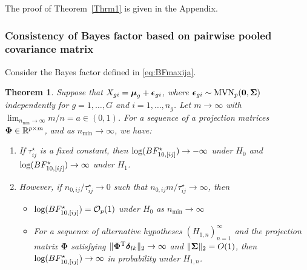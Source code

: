 \documentclass[times,sort&compress,3p]{elsarticle}
\theoremstyle{plain}%
\newtheorem{theorem}{Theorem}
\theoremstyle{definition}
\def\bzero{{\mathbf 0}}
\def\log{\hbox{log}}
\def\MVN{\hbox{MVN}}
\def\log{\hbox{log}}
\def\trans{^{\rm T}}
\def\bzero{{\mathbf 0}}
\newcommand{\bSigma}{\mbox{\boldmath $\Sigma$}}
\newcommand{\udelta}            {\mbox{\boldmath$\delta$}}
\newcommand{\uepsilon}          {\mbox{\boldmath$\epsilon$}}
\newcommand{\umu}               {\mbox{\boldmath$\mu$}}
\newcommand{\uSigma}            {\mbox{\boldmath$\Sigma$}}
\newcommand{\uPhi}              {\mbox{\boldmath$\Phi$}}
\begin{document}
The proof of Theorem~\ref{Thrm1} is given in the Appendix.

\subsubsection{Consistency of Bayes factor based on pairwise pooled covariance matrix}
Consider the Bayes factor defined in \eqref{eq:BFmaxija}. 
\begin{theorem}\label{Thrm2}
Suppose that $X_{gi} = \umu_g + \uepsilon_{gi}$, where $\uepsilon_{gi} \sim \MVN_{p}(\bzero, \uSigma)$ independently for $g = 1, \ldots, G$ and $i = 1,\ldots,n_g$. Let $m \rightarrow \infty$ with $ \lim_{n_{\min} \rightarrow \infty} m / n =  a \in  (0, 1)$. For a sequence of a projection matrices $\uPhi \in \mathbb{R}^{p \times m}$, and as $n_{\min} \rightarrow \infty$, we have:
\begin{enumerate}
    \item If $\tau^{\star}_{ij}$ is a fixed constant, 
    then $\log(BF^{\star}_{10, [ij]}) \rightarrow -\infty$ under $H_0$ and $\log(BF^{\star}_{10, [ij]}) \rightarrow \infty$ under $H_1$. 
    \item However, if $n_{0,ij}/\tau^{\star}_{ij} \rightarrow 0$ such that $n_{0,ij} m/\tau^{\star}_{ij} \rightarrow \infty$, then
    \begin{itemize}
     \item[(a)]  $\log(BF^{\star}_{10, [ij]}) = \mathcal{O}_{p}(1)$ under $H_0$ as $n_{\min} \rightarrow \infty$ 
     \item[(b)] 
     For a sequence of alternative hypotheses $(H_{1,n})_{n = 1}^\infty$ and the projection matrix $\mathbf{\Phi}$ satisfying $\|\mathbf{\Phi}\trans\udelta_{lk}\|_2\to\infty$ and $\|\bSigma\|_2 = O(1)$, then $\log(BF^{\star}_{10, [ij]}) \rightarrow \infty$ in probability under $H_{1,n}$. 
    \end{itemize}
\end{enumerate}
\end{theorem}
\end{document}
